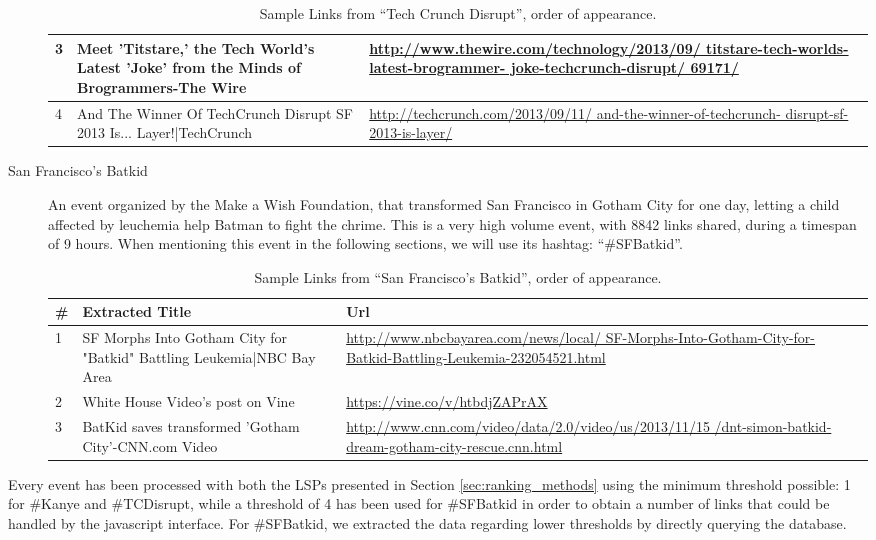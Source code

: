 \documentclass{sig-alternate}
\begin{document}
\begin{description}
\begin{table}
\begin{tabular}{| p{0.5cm} | p{2cm} | p{5cm} |}
  3 & Meet 'Titstare,' the Tech World's Latest 'Joke' from the Minds of Brogrammers-The Wire &\url{http://www.thewire.com/technology/2013/09/ titstare-tech-worlds-latest-brogrammer- joke-techcrunch-disrupt/ 69171/} \\
\hline
  4 & And The Winner Of TechCrunch Disrupt SF 2013 Is... Layer!|TechCrunch &\url{http://techcrunch.com/2013/09/11/ and-the-winner-of-techcrunch- disrupt-sf-2013-is-layer/} \\
\hline
\end{tabular}
\caption{Sample Links from ``Tech Crunch Disrupt'', order of appearance.}
\label{table:tcdisrupt}
\end{table}
\item[San Francisco's Batkid] An event organized by the Make a Wish Foundation, that transformed San Francisco in Gotham City for one day, letting a child affected by leuchemia help Batman to fight the chrime. This is a very high volume event, with 8842 links shared, during a timespan of 9 hours. When mentioning this event in the following sections, we will use its hashtag: ``\#SFBatkid''.
\begin{table}
\begin{tabular}{| p{0.5cm} | p{2cm} | p{5cm} |}
  \hline
  \textbf{\#} & \textbf{Extracted Title} & \textbf{Url} \\
  \hline
  1 &SF Morphs Into Gotham City for "Batkid" Battling Leukemia|NBC Bay Area & \url{http://www.nbcbayarea.com/news/local/ SF-Morphs-Into-Gotham-City-for- Batkid-Battling-Leukemia-232054521.html} \\
\hline
  2 &White House Video's post on Vine &\url{https://vine.co/v/htbdjZAPrAX} \\
\hline
  3 & BatKid saves transformed 'Gotham City'-CNN.com Video&\url{http://www.cnn.com/video/data/2.0/video/us/2013/11/15 /dnt-simon-batkid- dream-gotham-city-rescue.cnn.html} \\
\hline
\end{tabular}
\caption{Sample Links from ``San Francisco's Batkid'', order of appearance.}
\label{table:sfbatkid}
\end{table}
\end{description}

Every event has been processed with both the LSPs presented in Section \ref{sec:ranking_methods} using the minimum threshold possible: 1 for \#Kanye and \#TCDisrupt, while a threshold of 4 has been used for \#SFBatkid in order to obtain a number of links that could be handled by the javascript interface. For \#SFBatkid, we extracted the data regarding lower thresholds by directly querying the database.
\end{document}
